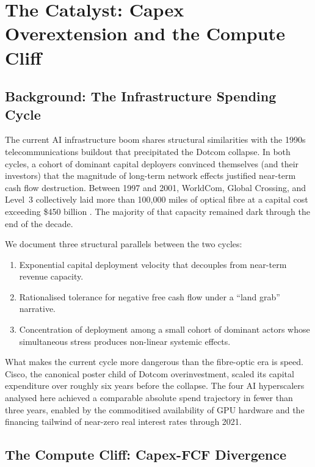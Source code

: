 
\section{The Catalyst: Capex Overextension and the Compute Cliff}
\label{sec:intro}

\subsection{Background: The Infrastructure Spending Cycle}

The current AI infrastructure boom shares structural similarities with the 1990s
telecommunications buildout that precipitated the Dotcom collapse. In both cycles,
a cohort of dominant capital deployers convinced themselves (and their investors) that
the magnitude of long-term network effects justified near-term cash flow destruction.
Between 1997 and 2001, WorldCom, Global Crossing, and Level~3 collectively laid
more than 100{,}000 miles of optical fibre at a capital cost exceeding \$450 billion
\citep{blum2002}. The majority of that capacity remained dark through the end of the decade.

We document three structural parallels between the two cycles:

\begin{enumerate}
  \item Exponential capital deployment velocity that decouples from near-term revenue capacity.
  \item Rationalised tolerance for negative free cash flow under a ``land grab'' narrative.
  \item Concentration of deployment among a small cohort of dominant actors whose
        simultaneous stress produces non-linear systemic effects.
\end{enumerate}

What makes the current cycle more dangerous than the fibre-optic era is speed. Cisco,
the canonical poster child of Dotcom overinvestment, scaled its capital expenditure
over roughly six years before the collapse. The four AI hyperscalers analysed here
achieved a comparable absolute spend trajectory in fewer than three years, enabled by
the commoditised availability of GPU hardware and the financing tailwind of near-zero
real interest rates through 2021.

\subsection{The Compute Cliff: Capex-FCF Divergence}

